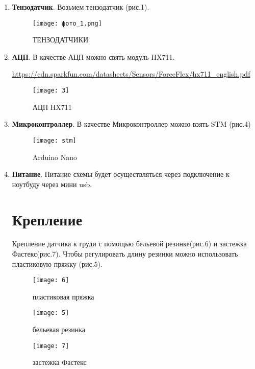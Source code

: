 \begin{enumerate}
\item \textbf{Тензодатчик}. Возьмем тензодатчик (рис.1).


	\begin{figure}[h]
		\centering
		\texttt{[image: фото\_1.png]}
		\caption{ТЕНЗОДАТЧИКИ}
	\end{figure}


\item \textbf{АЦП}. В качестве АЦП можно свять модуль HX711. 

\url{https://cdn.sparkfun.com/datasheets/Sensors/ForceFlex/hx711_english.pdf}

\newpage

	\begin{figure}[h]
		\centering
		\texttt{[image: 3]}
		\caption{АЦП HX711}
	\end{figure}

\item \textbf{Микроконтроллер}. В качестве Микроконтроллер можно взять STM (рис.4)

	\begin{figure}[h]
		\centering
		\texttt{[image: stm]}
		\caption{Arduino Nano}
	\end{figure}

\item \textbf{Питание}. Питание схемы будет осуществляться через подключение к ноутбуду через мини usb. 

\section{Крепление}

Крепление датчика к груди с помощью бельевой резинке(рис.6) и застежка Фастекс(рис.7). Чтобы регулировать длину резинки можно использовать пластиковую пряжку (рис.5).

	\begin{figure}[h]
		\centering
		\texttt{[image: 6]}
		\caption{пластиковая пряжка}
	\end{figure}

\newpage

\begin{figure}[h]
\begin{center}
\begin{minipage}[h]{0.4\linewidth}
\texttt{[image: 5]}
\caption{бельевая резинка} %
\label{ris:experimoriginal} %
\end{minipage}
\hfill
\begin{minipage}[h]{0.4\linewidth}
\texttt{[image: 7]}
\caption{застежка Фастекс}
\label{ris:experimcoded}
\end{minipage}
\end{center}
\end{figure}
\end{enumerate}
